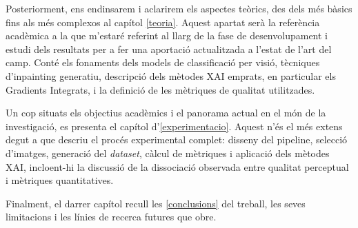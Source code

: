 Posteriorment, ens endinsarem i aclarirem els aspectes teòrics, des dels més bàsics fins als més complexos al capítol \ref{teoria}. Aquest apartat serà la referència acadèmica a la que m'estaré referint al llarg de la fase de desenvolupament i estudi dels resultats per a fer una aportació actualitzada a l'estat de l'art del camp. Conté els fonaments dels models de classificació per visió, tècniques d'inpainting generatiu, descripció dels mètodes \ac{XAI} emprats, en particular els Gradients Integrats, i la definició de les mètriques de qualitat utilitzades.

Un cop situats els objectius acadèmics i el panorama actual en el món de la investigació, es presenta el capítol d'\ref{experimentacio}. Aquest n'és el més extens degut a que descriu el procés experimental complet: disseny del pipeline, selecció d'imatges, generació del \emph{dataset}, càlcul de mètriques i aplicació dels mètodes \ac{XAI}, incloent-hi la discussió de la dissociació observada entre qualitat perceptual i mètriques quantitatives.

Finalment, el darrer capítol recull les \ref{conclusions} del treball, les seves limitacions i les línies de recerca futures que obre.
